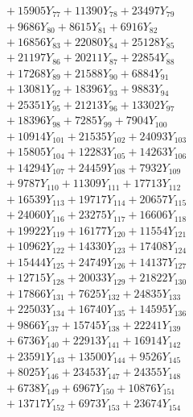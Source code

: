 \documentclass[a4paper,10pt]{article}
\begin{document}
{\begin{align}
&\;  + 15905 Y_{77} + 11390 Y_{78} + 23497 Y_{79} \\[0.3ex]
&\;  + 9686 Y_{80} + 8615 Y_{81} + 6916 Y_{82} \\[0.3ex]
&\;  + 16856 Y_{83} + 22080 Y_{84} + 25128 Y_{85} \\[0.3ex]
&\;  + 21197 Y_{86} + 20211 Y_{87} + 22854 Y_{88} \\[0.5ex]\allowbreak
&\;  + 17268 Y_{89} + 21588 Y_{90} + 6884 Y_{91} \\[0.3ex]
&\;  + 13081 Y_{92} + 18396 Y_{93} + 9883 Y_{94} \\[0.3ex]
&\;  + 25351 Y_{95} + 21213 Y_{96} + 13302 Y_{97} \\[0.3ex]
&\;  + 18396 Y_{98} + 7285 Y_{99} + 7904 Y_{100} \\[0.3ex]
&\;  + 10914 Y_{101} + 21535 Y_{102} + 24093 Y_{103} \\[0.3ex]
&\;  + 15805 Y_{104} + 12283 Y_{105} + 14263 Y_{106} \\[0.3ex]
&\;  + 14294 Y_{107} + 24459 Y_{108} + 7932 Y_{109} \\[0.3ex]
&\;  + 9787 Y_{110} + 11309 Y_{111} + 17713 Y_{112} \\[0.3ex]
&\;  + 16539 Y_{113} + 19717 Y_{114} + 20657 Y_{115} \\[0.3ex]
&\;  + 24060 Y_{116} + 23275 Y_{117} + 16606 Y_{118} \\[0.5ex]\allowbreak
&\;  + 19922 Y_{119} + 16177 Y_{120} + 11554 Y_{121} \\[0.3ex]
&\;  + 10962 Y_{122} + 14330 Y_{123} + 17408 Y_{124} \\[0.3ex]
&\;  + 15444 Y_{125} + 24749 Y_{126} + 14137 Y_{127} \\[0.3ex]
&\;  + 12715 Y_{128} + 20033 Y_{129} + 21822 Y_{130} \\[0.3ex]
&\;  + 17866 Y_{131} + 7625 Y_{132} + 24835 Y_{133} \\[0.3ex]
&\;  + 22503 Y_{134} + 16740 Y_{135} + 14595 Y_{136} \\[0.3ex]
&\;  + 9866 Y_{137} + 15745 Y_{138} + 22241 Y_{139} \\[0.3ex]
&\;  + 6736 Y_{140} + 22913 Y_{141} + 16914 Y_{142} \\[0.3ex]
&\;  + 23591 Y_{143} + 13500 Y_{144} + 9526 Y_{145} \\[0.3ex]
&\;  + 8025 Y_{146} + 23453 Y_{147} + 24355 Y_{148} \\[0.5ex]\allowbreak
&\;  + 6738 Y_{149} + 6967 Y_{150} + 10876 Y_{151} \\[0.3ex]
&\;  + 13717 Y_{152} + 6973 Y_{153} + 23674 Y_{154} \\[0.3ex]

\end{align}}
\end{document}
